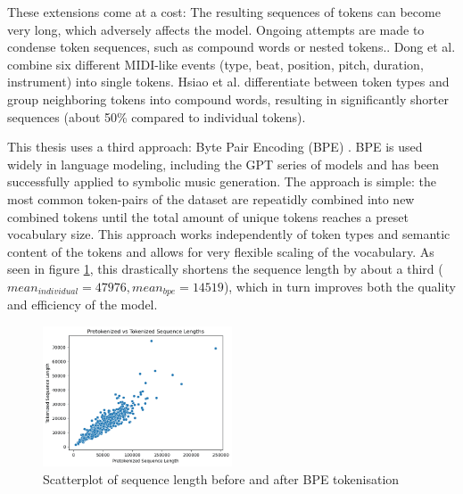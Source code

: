 These extensions come at a cost: The resulting sequences of tokens can become very long, which adversely affects the model\cite{Ji_Yang_Luo_survey_symbolic_2024}. Ongoing attempts are made to condense token sequences, such as compound words or nested tokens.\cite{Ryu_Dong_nested_2024}. Dong et al.\cite{Dong_Chen_MMT_Kirkpatrick_2023} combine six different MIDI-like events (type, beat, position, pitch, duration, instrument) into single tokens. Hsiao et al.\cite{compound_word_Hsiao_Liu_Yeh_Yang_2021} differentiate between token types and group neighboring tokens into compound words, resulting in significantly shorter sequences (about 50\% compared to individual tokens). 

This thesis uses a third approach: Byte Pair Encoding (BPE) \cite{Sennrich_Haddow_Birch_BPE_2016}. BPE is used widely in language modeling, including the GPT series of models\cite{Radford_Wu_Child_Luan_gpt2_2019} and has been successfully applied to symbolic music generation.\cite{Fradet_Gutowski_Chhel_Briot_2023} The approach is simple: the most common token-pairs of the dataset are repeatidly combined into new combined tokens until the total amount of unique tokens reaches a preset vocabulary size. This approach works independently of token types and semantic content of the tokens and allows for very flexible scaling of the vocabulary. As seen in figure \ref{fig:tok_compare}, this drastically shortens the sequence length by about a third ($mean_{individual}=47976, mean_{bpe}=14519$), which in turn improves both the quality and efficiency of the model. 


\begin{figure}[H]
    \centering
    \includegraphics[width=0.5\textwidth]{IMAGES/scatter_pre_post_tok.png} 
    \caption{Scatterplot of sequence length before and after BPE tokenisation}
    \label{fig:tok_compare}
\end{figure}


